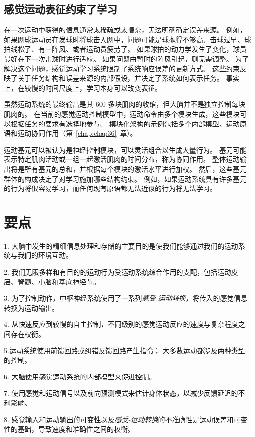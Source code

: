 \subsection{感觉运动表征约束了学习}

在一次运动中获得的信息通常太稀疏或太嘈杂，无法明确确定误差来源。
例如，如果网球运动员在发球时将球击入网中，问题可能是球抛得不够高、击球过早、球拍线松了、有一阵风、或者运动员疲劳了。
如果球拍的动力学发生了变化，球员最好在下一次击球时进行适应。
如果问题由暂时的阵风引起，则无需调整。
为了解决这个问题，感觉运动学习系统限制了系统响应误差的更新方式。
这些约束反映了关于任务结构和误差来源的内部假设，并决定了系统如何表示任务。
事实上，在较慢的时间尺度上，学习本身可以改变表征。


虽然运动系统的最终输出是其 600 多块肌肉的收缩，但大脑并不是独立控制每块肌肉的。
在当前的感觉运动控制模型中，运动命令由多个模块生成，这些模块可以根据任务的要求有选择地参与。
模块化架构的示例包括多个内部模型、运动原语和运动协同作用（第~\ref{chap:chap36}~章）。


运动基元可以被认为是神经控制模块，可以灵活组合以生成大量行为。
基元可能表示特定肌肉活动或一组一起激活肌肉的时间分布，称为协同作用。
整体运动输出将是所有基元的总和，并根据每个模块的激活水平进行加权。
然后，这些基元群体的构成决定了对学习施加哪些结构约束。
例如，如果运动系统具有许多基元的行为将很容易学习，而任何现有原语都无法近似的行为将无法学习。



\section{要点}

1. 大脑中发生的精细信息处理和存储的主要目的是使我们能够通过我们的运动系统与我们的环境互动。


2. 我们无限多样和有目的的运动行为受运动系统综合作用的支配，包括运动皮层、脊髓、小脑和基底神经节。


3. 为了控制动作，中枢神经系统使用了一系列\textit{感受-运动转换}，将传入的感觉信息转换为运动输出。


4. 从快速反应到较慢的自主控制，不同级别的感觉运动反应的速度与复杂程度之间存在权衡。


5.运动系统使用前馈回路或纠错反馈回路产生指令；
大多数运动都涉及两种类型的控制。


6. 大脑使用感觉运动系统的内部模型来促进控制。


7. 使用感觉和运动信号以及前向预测模式来估计身体状态，以减少反馈延迟的不利影响。


8. 感觉输入和运动输出的可变性以及\textit{感受-运动转换}的不准确性是运动误差和可变性的基础，导致速度和准确性之间的权衡。


